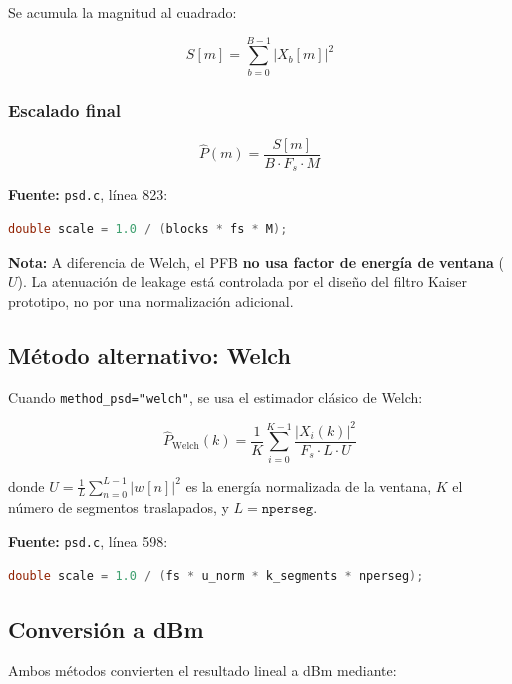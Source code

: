\documentclass[11pt,a4paper]{article}
\begin{document}
Se acumula la magnitud al cuadrado:

\begin{equation}
S[m] = \sum_{b=0}^{B-1} |X_b[m]|^2
\label{eq:pfb_accum}
\end{equation}

\subsubsection{Escalado final}

\begin{equation}
\hat{P}(m) = \frac{S[m]}{B \cdot F_s \cdot M}
\label{eq:pfb_scale}
\end{equation}

\textbf{Fuente:} \texttt{psd.c}, línea 823:
\begin{lstlisting}[language=C]
double scale = 1.0 / (blocks * fs * M);
\end{lstlisting}

\textbf{Nota:} A diferencia de Welch, el PFB \textbf{no usa factor de energía de ventana} ($U$). La atenuación de leakage está controlada por el diseño del filtro Kaiser prototipo, no por una normalización adicional.

\subsection{Método alternativo: Welch}

Cuando \texttt{method\_psd="welch"}, se usa el estimador clásico de Welch:

\begin{equation}
\hat{P}_{\text{Welch}}(k) = \frac{1}{K} \sum_{i=0}^{K-1} \frac{|X_i(k)|^2}{F_s \cdot L \cdot U}
\label{eq:welch_raw}
\end{equation}

donde $U = \frac{1}{L}\sum_{n=0}^{L-1} |w[n]|^2$ es la energía normalizada de la ventana, $K$ el número de segmentos traslapados, y $L = \texttt{nperseg}$.

\textbf{Fuente:} \texttt{psd.c}, línea 598:
\begin{lstlisting}[language=C]
double scale = 1.0 / (fs * u_norm * k_segments * nperseg);
\end{lstlisting}

\subsection{Conversión a dBm}

Ambos métodos convierten el resultado lineal a dBm mediante:
\end{document}
